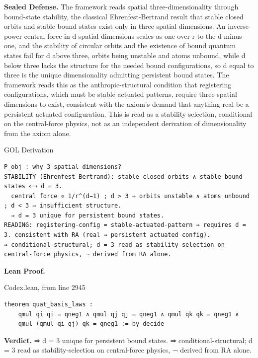 \documentclass[10pt,twocolumn]{article}
\begin{document}
\textbf{Sealed Defense.} The framework reads spatial
three-dimensionality through bound-state stability, the classical
Ehrenfest-Bertrand result that stable closed orbits and stable bound
states exist only in three spatial dimensions. An inverse-power central
force in d spatial dimensions scales as one over r-to-the-d-minus-one,
and the stability of circular orbits and the existence of bound quantum
states fail for d above three, orbits being unstable and atoms unbound,
while d below three lacks the structure for the needed bound
configurations, so d equal to three is the unique dimensionality
admitting persistent bound states. The framework reads this as the
anthropic-structural condition that registering configurations, which
must be stable actuated patterns, require three spatial dimensions to
exist, consistent with the axiom's demand that anything real be a
persistent actuated configuration. This is read as a stability
selection, conditional on the central-force physics, not as an
independent derivation of dimensionality from the axiom alone.

\begin{golbox}{GOL Derivation}
\begin{lstlisting}[style=golv]
P_obj : why 3 spatial dimensions?
STABILITY (Ehrenfest-Bertrand): stable closed orbits ∧ stable bound states ⟺ d = 3.
  central force ∝ 1/r^(d−1) ; d > 3 ⇒ orbits unstable ∧ atoms unbound ; d < 3 ⇒ insufficient structure.
  ⇒ d = 3 unique for persistent bound states.
READING: registering-config = stable-actuated-pattern ⇒ requires d = 3. consistent with RA (real ⇒ persistent actuated config).
⇒ conditional-structural; d = 3 read as stability-selection on central-force physics, ¬ derived from RA alone.
\end{lstlisting}
\end{golbox}

\textbf{Lean Proof.}

\begin{leanexcerpt}{Codex.lean, from line 2945}
\begin{lstlisting}[style=leanx,firstnumber=2945]
theorem quat_basis_laws :
    qmul qi qi = qneg1 ∧ qmul qj qj = qneg1 ∧ qmul qk qk = qneg1 ∧
    qmul (qmul qi qj) qk = qneg1 := by decide
\end{lstlisting}
\end{leanexcerpt}

\textbf{Verdict.} ⇒ d = 3 unique for persistent bound states. ⇒
conditional-structural; d = 3 read as stability-selection on
central-force physics, ¬ derived from RA alone.
\end{document}
